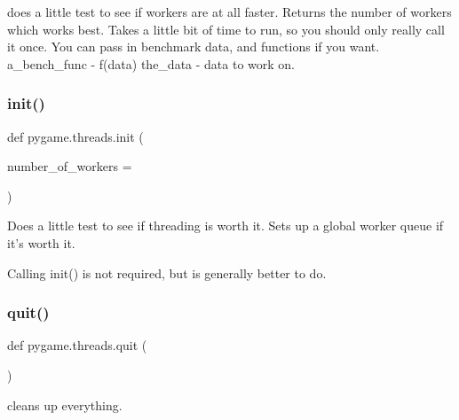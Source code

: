 \begin{DoxyVerb}does a little test to see if workers are at all faster.
    Returns the number of workers which works best.
    Takes a little bit of time to run, so you should only really call
      it once.
    You can pass in benchmark data, and functions if you want.
    a_bench_func - f(data)
    the_data - data to work on.
\end{DoxyVerb}
 \mbox{\label{namespacepygame_1_1threads_ae46d2018611d92c7aaed2a910a68d334}} 
\subsubsection{\texorpdfstring{init()}{init()}}
{\footnotesize\ttfamily def pygame.\+threads.\+init (\begin{DoxyParamCaption}\item[{}]{number\+\_\+of\+\_\+workers = {} }\end{DoxyParamCaption})}

\begin{DoxyVerb}Does a little test to see if threading is worth it.
      Sets up a global worker queue if it's worth it.

    Calling init() is not required, but is generally better to do.
\end{DoxyVerb}
 \mbox{\label{namespacepygame_1_1threads_a68b34d829709c92a3a928a6c523c26d3}} 
\subsubsection{\texorpdfstring{quit()}{quit()}}
{\footnotesize\ttfamily def pygame.\+threads.\+quit (\begin{DoxyParamCaption}{ }\end{DoxyParamCaption})}

\begin{DoxyVerb}cleans up everything.
\end{DoxyVerb}
 \mbox{\label{namespacepygame_1_1threads_a970354d230ca56169d26606be8997346}} 
